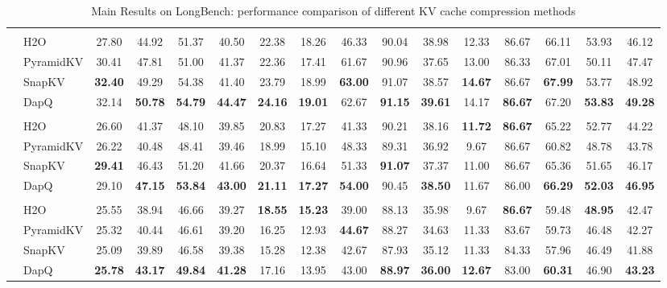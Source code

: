 \begin{table}[t]
{\begin{tabular}{>{\bfseries}c >{\raggedright}p{1.2cm} *{14}{c}}
& \multicolumn{15}{c}{\cellcolor{gray!20}\textbf{KV Cache Size = 256}} \\
\multirow{12}{*}{\rotatebox{90}{Qwen3-8B}} & H2O & 27.80 & 44.92 & 51.37 & 40.50 & 22.38 & 18.26 & 46.33 & 90.04 & 38.98 & 12.33 & 86.67 & 66.11 & 53.93 & 46.12 \\
& PyramidKV & 30.41 & 47.81 & 51.00 & 41.37 & 22.36 & 17.41 & 61.67 & 90.96 & 37.65 & 13.00 & 86.33 & 67.01 & 50.11 & 47.47 \\
& SnapKV & \textbf{32.40} & 49.29 & 54.38 & 41.40 & 23.79 & 18.99 & \textbf{63.00} & 91.07 & 38.57 & \textbf{14.67} & 86.67 & \textbf{67.99} & 53.77 & 48.92 \\
& DapQ & 32.14 & \textbf{50.78} & \textbf{54.79} & \textbf{44.47} & \textbf{24.16} & \textbf{19.01} & 62.67 & \textbf{91.15} & \textbf{39.61} & 14.17 & \textbf{86.67} & 67.20 & \textbf{53.83} & \textbf{49.28} \\
& \multicolumn{15}{c}{\cellcolor{gray!20}\textbf{KV Cache Size = 128}} \\
& H2O & 26.60 & 41.37 & 48.10 & 39.85 & 20.83 & 17.27 & 41.33 & 90.21 & 38.16 & \textbf{11.72} & \textbf{86.67} & 65.22 & 52.77 & 44.22 \\
& PyramidKV & 26.22 & 40.48 & 48.41 & 39.46 & 18.99 & 15.10 & 48.33 & 89.31 & 36.92 & 9.67 & 86.67 & 60.82 & 48.78 & 43.78 \\
& SnapKV & \textbf{29.41} & 46.43 & 51.20 & 41.66 & 20.37 & 16.64 & 51.33 & \textbf{91.07} & 37.37 & 11.00 & 86.67 & 65.36 & 51.65 & 46.17 \\
& DapQ & 29.10 & \textbf{47.15} & \textbf{53.84} & \textbf{43.00} & \textbf{21.11} & \textbf{17.27} & \textbf{54.00} & 90.45 & \textbf{38.50} & 11.67 & 86.00 & \textbf{66.29} & \textbf{52.03} & \textbf{46.95} \\
& \multicolumn{15}{c}{\cellcolor{gray!20}\textbf{KV Cache Size = 64}} \\
& H2O & 25.55 & 38.94 & 46.66 & 39.27 & \textbf{18.55} & \textbf{15.23} & 39.00 & 88.13 & 35.98 & 9.67 & \textbf{86.67} & 59.48 & \textbf{48.95} & 42.47 \\
& PyramidKV & 25.32 & 40.44 & 46.61 & 39.20 & 16.25 & 12.93 & \textbf{44.67} & 88.27 & 34.63 & 11.33 & 83.67 & 59.73 & 46.48 & 42.27 \\
& SnapKV & 25.09 & 39.89 & 46.58 & 39.38 & 15.28 & 12.38 & 42.67 & 87.93 & 35.12 & 11.33 & 84.33 & 57.96 & 46.49 & 41.88 \\
& DapQ & \textbf{25.78} & \textbf{43.17} & \textbf{49.84} & \textbf{41.28} & 17.16 & 13.95 & 43.00 & \textbf{88.97} & \textbf{36.00} & \textbf{12.67} & 83.00 & \textbf{60.31} & 46.90 & \textbf{43.23} \\
\bottomrule
\end{tabular}
}
\vspace{-9pt}
\caption{Main Results on LongBench: performance comparison of different KV cache compression methods}
\vspace{-12pt}
\label{table:longbench}
\end{table}

% 
